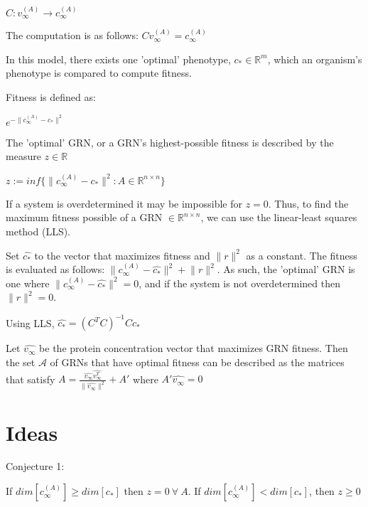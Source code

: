 \documentclass[a4paper,12pt]{article}
\begin{document}
$C: v_{\infty}^{(A)} \rightarrow c^{(A)}_{\infty}$

The computation is as follows: $Cv_{\infty}^{(A)} = c_{\infty}^{(A)}$

In this model, there exists one 'optimal' phenotype, $c_{*} \in \mathbb{R}^{m}$, which an organism's phenotype is compared to compute fitness. 

Fitness is defined as: 

$e^{-\lVert c_{\infty}^{(A)} - c_{*} \rVert^{2}}$

The 'optimal' GRN, or a GRN's highest-possible fitness is described by the measure $z \in \mathbb{R}$

$ z := inf\{\lVert c_{\infty}^{(A)} - c_{*} \rVert^{2}: A \in \mathbb{R}^{n \times n}\}$

If a system is overdetermined it may be impossible for $z = 0$. Thus, to find the maximum fitness possible of a GRN $\in \mathbb{R}^{n \times n}$, we can use the linear-least squares method (LLS). 

Set $\hat{c_{*}}$ to the vector that maximizes fitness and $\lVert r \rVert^{2}$ as a constant. The fitness is evaluated as follows: $\lVert c_{\infty}^{(A)} - \hat{c_{*}} \rVert^{2} + \lVert r \rVert^{2}$. As such, the 'optimal' GRN is one where $ \lVert c_{\infty}^{(A)} - \hat{c_{*}} \rVert^{2} = 0$, and if the system is not overdetermined then $ \lVert r \rVert^{2} = 0$. 

Using LLS, $\hat{c_{*}} = (C^{T}C)^{-1}Cc_{*}$

Let $\hat{v_{\infty}}$ be the protein concentration vector that maximizes GRN fitness. Then the set $\mathcal{A}$ of GRNs that have optimal fitness can be described as the matrices that satisfy $A = \frac{\hat{v_{\infty}} \hat{v_{\infty}^{T}}}{\lVert \hat{v_{\infty}} \rVert^{2}} + A'$ where $A' \hat{v_{\infty}} = 0$

\section{Ideas}

Conjecture 1:

 If $dim{[c_{\infty}^{(A)}]} \geq dim{[c_{*}]}$ then $z = 0\ \forall \ A$. If $dim{[c_{\infty}^{(A)}]} <  dim{[c_{*}]}$, then $z \geq 0$
\end{document}
